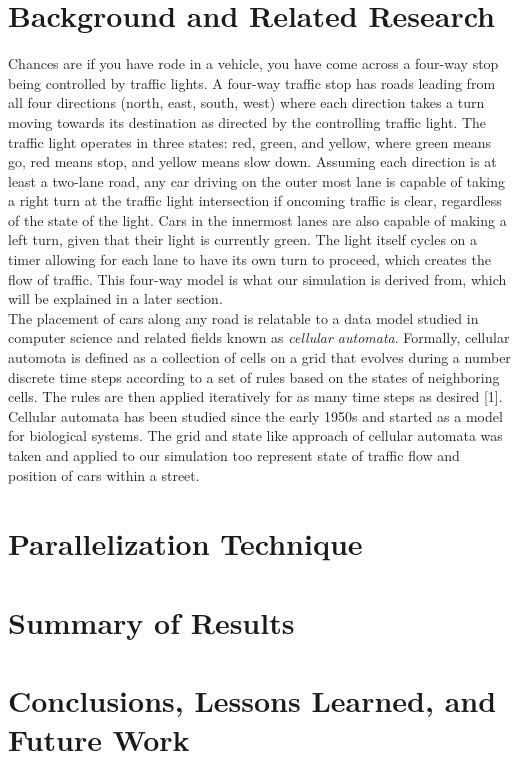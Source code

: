 \documentclass[conference]{IEEEtran}
\begin{document}
\section{Background and Related Research}
Chances are if you have rode in a vehicle, you have come across a four-way stop being controlled by traffic lights. A four-way traffic stop has roads leading from all four directions (north, east, south, west) where each direction takes a turn moving towards its destination as directed by the controlling traffic light. The traffic light operates in three states: red, green, and yellow, where green means go, red means stop, and yellow means slow down. Assuming each direction is at least a two-lane road, any car driving on the outer most lane is capable of taking a right turn at the traffic light intersection if oncoming traffic is clear, regardless of the state of the light. Cars in the innermost lanes are also capable of making a left turn, given that their light is currently green. The light itself cycles on a timer allowing for each lane to have its own turn to proceed, which creates the flow of traffic. This four-way model is what our simulation is derived from, which will be explained in a later section. \\
The placement of cars along any road is relatable to a data model studied in computer science and related fields known as \textit{cellular automata}. Formally, cellular automota is defined as a collection of cells on a grid that evolves during a number discrete time steps according to a set of rules based on the states of neighboring cells. The rules are then applied iteratively for as many time steps as desired [1]. Cellular automata has been studied since the early 1950s and started as a model for biological systems. The grid and state like approach of cellular automata was taken and applied to our simulation too represent state of traffic flow and position of cars within a street.

\section{Parallelization Technique}
\lipsum[3] \cite{ORourke2005}

\section{Summary of Results}
\lipsum[4]

\section{Conclusions, Lessons Learned, and Future Work}
\lipsum[5]



\end{document}
